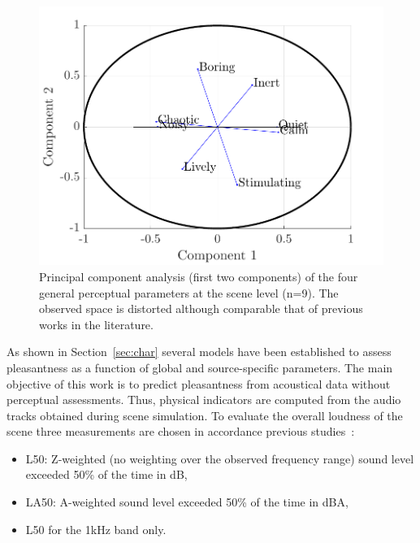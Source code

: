 \documentclass{article}
\begin{document}
\begin{sloppy}
\begin{figure}[t]
  \centering
  \centerline{\includegraphics[width=\columnwidth]{pca.pdf}}
  \caption{Principal component analysis (first two components) of the four general perceptual parameters at the scene level (n=9). The observed space is distorted although comparable that of previous works in the literature.}
  \label{fig:pca}
\end{figure}

As shown in Section~\ref{sec:char} several models have been established to assess pleasantness as a function of global and source-specific parameters. The main objective of this work is to predict pleasantness from acoustical data without perceptual assessments. Thus, physical indicators are computed from the audio tracks obtained during scene simulation. To evaluate the overall loudness of the scene three measurements are chosen in accordance previous studies~\cite{decoensel2006, ricciardi2014, aumond2017}:
\begin{itemize}
\item L50: Z-weighted (no weighting over the observed frequency range) sound level exceeded 50\% of the time in dB,
\item LA50: A-weighted sound level exceeded 50\% of the time in dBA,
\item L50 for the 1kHz band only.
\end{itemize}



\end{sloppy}
\end{document}
